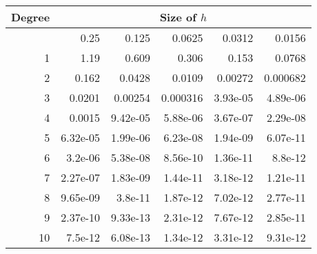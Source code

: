 \begin{tabular}{|r|r|r|r|r|r|}    
    \hline
    Degree &        \multicolumn{5}{c|}{Size of $h$}          \\
    \hline
    & 0.25     & 0.125    & 0.0625   & 0.0312   & 0.0156   \\
    \hline
 1  & 1.19     & 0.609    & 0.306    & 0.153    & 0.0768   \\
    \hline
 2  & 0.162    & 0.0428   & 0.0109   & 0.00272  & 0.000682 \\
    \hline
 3  & 0.0201   & 0.00254  & 0.000316 & 3.93e-05 & 4.89e-06 \\
    \hline
 4  & 0.0015   & 9.42e-05 & 5.88e-06 & 3.67e-07 & 2.29e-08 \\
    \hline
 5  & 6.32e-05 & 1.99e-06 & 6.23e-08 & 1.94e-09 & 6.07e-11 \\
    \hline
 6  & 3.2e-06  & 5.38e-08 & 8.56e-10 & 1.36e-11 & 8.8e-12  \\
    \hline
 7  & 2.27e-07 & 1.83e-09 & 1.44e-11 & 3.18e-12 & 1.21e-11 \\
    \hline
 8  & 9.65e-09 & 3.8e-11  & 1.87e-12 & 7.02e-12 & 2.77e-11 \\
    \hline
 9  & 2.37e-10 & 9.33e-13 & 2.31e-12 & 7.67e-12 & 2.85e-11 \\
    \hline
 10 & 7.5e-12  & 6.08e-13 & 1.34e-12 & 3.31e-12 & 9.31e-12 \\
\hline
\end{tabular}